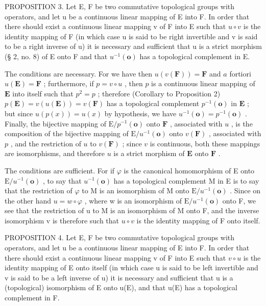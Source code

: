 PROPOSITION 3. Let E, F be two commutative topological groups with operators, and let u be a continuous linear mapping of E into F. In order that there should exist a continuous linear mapping v of F into E such that \(u \circ v\) is the identity mapping of F (in which case u is said to be right invertible and v is said to be a right inverse of u) it is necessary and sufficient that u is a strict morphism (§ 2, no. 8) of E onto F and that \(u^{-1}(\mathbf{o})\) has a topological complement in E.

The conditions are necessary. For we have then \(u(v(\mathbf{F})) = \mathbf{F}\) and \(a\) fortiori \(u(\mathbf{E}) = \mathbf{F}\) ; furthermore, if \(p = v \circ u\) , then \(p\) is a continuous linear mapping of \(\mathbf{E}\) into itself such that \(p^2 = p\) ; therefore (Corollary to Proposition 2) \(p(\mathbf{E}) = v(u(\mathbf{E})) = v(\mathbf{F})\) has a topological complement \(p^{-1}(\mathbf{o})\) in \(\mathbf{E}\) ; but since \(u(p(x)) = u(x)\) by hypothesis, we have \(u^{-1}(\mathbf{o}) = p^{-1}(\mathbf{o})\) . Finally, the bijective mapping of \(\mathrm{E}/p^{-1}(\mathbf{o})\) onto \(\mathbf{F}\) , associated with \(u\) , is the composition of the bijective mapping of \(\mathrm{E}/u^{-1}(\mathbf{o})\) onto \(v(\mathbf{F})\) , associated with \(p\) , and the restriction of \(u\) to \(v(\mathbf{F})\) ; since \(v\) is continuous, both these mappings are isomorphisms, and therefore \(u\) is a strict morphism of \(\mathbf{E}\) onto \(\mathbf{F}\) .

The conditions are sufficient. For if \(\varphi\) is the canonical homomorphism of E onto \(\mathrm{E}/u^{-1}(\mathbf{o})\) , to say that \(u^{-1}(\mathbf{o})\) has a topological complement M in E is to say that the restriction of \(\varphi\) to M is an isomorphism of M onto \(\mathrm{E}/u^{-1}(\mathbf{o})\) . Since on the other hand \(u=w\circ\varphi\) , where w is an isomorphism of \(\mathrm{E}/u^{-1}(\mathbf{o})\) onto F, we see that the restriction of u to M is an isomorphism of M onto F, and the inverse isomorphism v is therefore such that \(u\circ v\) is the identity mapping of F onto itself.

PROPOSITION 4. Let E, F be two commutative topological groups with operators, and let u be a continuous linear mapping of E into F. In order that there should exist a continuous linear mapping v of F into E such that \(v \circ u\) is the identity mapping of E onto itself (in which case u is said to be left invertible and v is said to be a left inverse of u) it is necessary and sufficient that u is a (topological) isomorphism of E onto u(E), and that u(E) has a topological complement in F.


